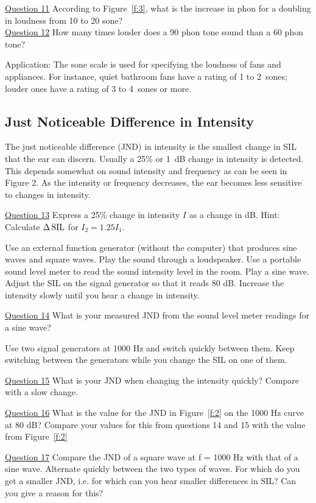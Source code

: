 \documentclass[11pt]{NSF}
\begin{document}
\underline{Question 11} According to Figure~\ref{f:3}, what is the increase in phon for a doubling in loudness from 10 to 20
sone? \\

\underline{Question 12} How many times louder does a 90 phon tone sound than a 60 phon tone? 


Application:
The sone scale is used for specifying the loudness of fans and
appliances. For instance, quiet bathroom fans have a rating of 1 to 
2~sones; louder ones have a rating of 3 to 4~sones or more.

\subsection{Just Noticeable Difference in Intensity}

The just noticeable difference (JND) in intensity is the smallest
change in SIL that the ear can discern. Usually a 25\% or 1~dB change in
intensity is detected. This depends somewhat on sound intensity and
frequency as can be seen in Figure 2. As the intensity or frequency
decreases, the ear becomes less sensitive to changes in intensity.

\underline{Question 13} Express a 25\% change in intensity $I$ as a change in dB. 
Hint: Calculate $\Delta\,{\rm SIL}$ for $I_2 = 1.25 I_1$.

Use an external function generator (without the computer) that produces sine waves and square
waves. Play the sound through a loudspeaker. Use a portable sound level meter to read the sound
intensity level in the room. Play a sine wave. Adjust the SIL on the signal generator so that it
reads 80 dB. Increase the intensity slowly until you hear a change in intensity.

\underline{Question 14} What is your measured JND from the sound level meter readings for a sine wave? 

Use two signal generators at 1000 Hz and switch quickly between them. Keep switching between
the generators while you change the SIL on one of them.

\underline{Question 15} What is your JND when changing the intensity quickly? Compare with a slow change.

\underline{Question 16} What is the value for the JND in Figure~\ref{f:2} on the 1000 Hz curve at 80 dB? 
Compare your values for this from questions 14
and 15 with the value from Figure~\ref{f:2}

\underline{Question 17} Compare the JND of a square wave at f = 1000 Hz with that of a sine wave. Alternate
quickly between the two types of waves. For which do you get a smaller JND, i.e. for which can
you hear smaller differences in SIL? Can you give a reason for this? 
\end{document}
